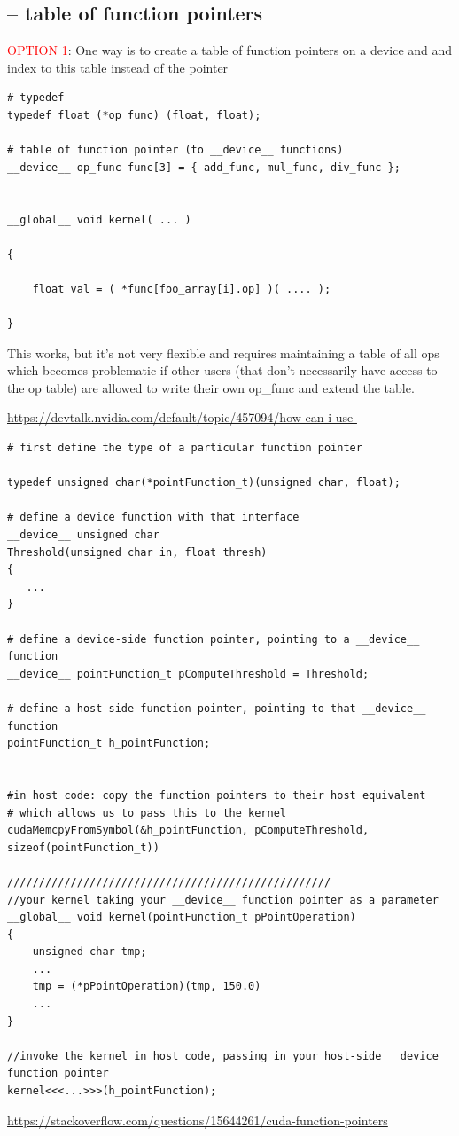 \subsection{-- table of function pointers}

\textcolor{red}{OPTION 1}: One way is to create a table of function pointers on a device and and index to
this table instead of the pointer
\begin{lstlisting}
# typedef 
typedef float (*op_func) (float, float);

# table of function pointer (to __device__ functions)
__device__ op_func func[3] = { add_func, mul_func, div_func };


__global__ void kernel( ... )

{

	float val = ( *func[foo_array[i].op] )( .... );

}

\end{lstlisting}

This works, but it's not very flexible and requires maintaining a table of all
ops which becomes problematic if other users (that don't necessarily have access
to the op table) are allowed to write their own op_func and extend the table.


\url{https://devtalk.nvidia.com/default/topic/457094/how-can-i-use-}

\begin{lstlisting}
# first define the type of a particular function pointer

typedef unsigned char(*pointFunction_t)(unsigned char, float);

# define a device function with that interface
__device__ unsigned char
Threshold(unsigned char in, float thresh)
{
   ...
}

# define a device-side function pointer, pointing to a __device__ function
__device__ pointFunction_t pComputeThreshold = Threshold;

# define a host-side function pointer, pointing to that __device__ function
pointFunction_t h_pointFunction;


#in host code: copy the function pointers to their host equivalent
# which allows us to pass this to the kernel
cudaMemcpyFromSymbol(&h_pointFunction, pComputeThreshold, sizeof(pointFunction_t))

///////////////////////////////////////////////////
//your kernel taking your __device__ function pointer as a parameter
__global__ void kernel(pointFunction_t pPointOperation)
{
    unsigned char tmp;
    ...
    tmp = (*pPointOperation)(tmp, 150.0)
    ...
}

//invoke the kernel in host code, passing in your host-side __device__ function pointer
kernel<<<...>>>(h_pointFunction);

\end{lstlisting}
\url{https://stackoverflow.com/questions/15644261/cuda-function-pointers}

